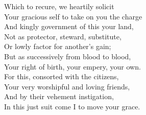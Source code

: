 \documentclass{article}
\begin{document}
\begin{description}
\hspace{1pt}Which to recure, we heartily solicit\\
\hspace{1pt}Your gracious self to take on you the charge\\
\hspace{1pt}And kingly government of this your land,\\
\hspace{1pt}Not as protector, steward, substitute,\\
\hspace{1pt}Or lowly factor for another's gain;\\
\hspace{1pt}But as successively from blood to blood,\\
\hspace{1pt}Your right of birth, your empery, your own.\\
\hspace{1pt}For this, consorted with the citizens,\\
\hspace{1pt}Your very worshipful and loving friends,\\
\hspace{1pt}And by their vehement instigation,\\
\hspace{1pt}In this just suit come I to move your grace.\\
\end{description}
\end{document}
